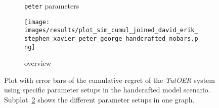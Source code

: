 \begin{figure}[ht]
\begin{subfigure}{0.48\linewidth}
	\caption{\texttt{peter} parameters}
	\label{fig:cumul_handcrafted_peter}
	\end{subfigure}
	\begin{subfigure}{\linewidth}
	\texttt{[image: images/results/plot\_sim\_cumul\_joined\_david\_erik\_stephen\_xavier\_peter\_george\_handcrafted\_nobars.png]}
	\caption{overview}
	\label{fig:cumul_handcrafted_overview_group1}
	\end{subfigure}
	\caption{Plot with error bars of the cumulative regret of the \emph{TutOER}
	system using specific parameter setups in the handcrafted model scenario.
	Subplot~\ref{fig:cumul_handcrafted_overview_group1} shows the
	different parameter setups in one graph.}
	\label{fig:cumul_handcrafted_container_group1}
\end{figure}


